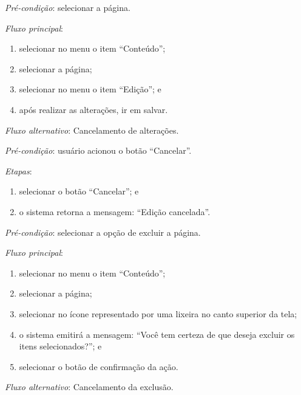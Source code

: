 \vspace{0.7cm}

\noindent \textit{Pré-condição}: selecionar a página.

\noindent \textit{Fluxo principal}:

\begin{enumerate}
    \item selecionar no menu o item ``Conteúdo'';
    \item selecionar a página;
    \item selecionar no menu o item ``Edição''; e
    \item após realizar as alterações, ir em salvar.
\end{enumerate}

\noindent \textit{Fluxo alternativo}: Cancelamento de alterações.

\noindent \textit{Pré-condição}: usuário acionou o botão ``Cancelar''.

\noindent \textit{Etapas}:

\begin{enumerate}
    \item selecionar o botão ``Cancelar''; e
    \item o sistema retorna a mensagem: ``Edição cancelada''.
\end{enumerate}


\vspace{0.7cm}

\noindent \textit{Pré-condição}: selecionar a opção de excluir a página.

\noindent \textit{Fluxo principal}:

\begin{enumerate}
    \item selecionar no menu o item ``Conteúdo'';
    \item selecionar a página;
    \item selecionar no ícone representado por uma lixeira no canto superior da tela;
    \item o sistema emitirá a mensagem: ``Você tem certeza de que deseja excluir os itens selecionados?''; e
    \item selecionar o botão de confirmação da ação.
\end{enumerate}

\noindent \textit{Fluxo alternativo}: Cancelamento da exclusão.

